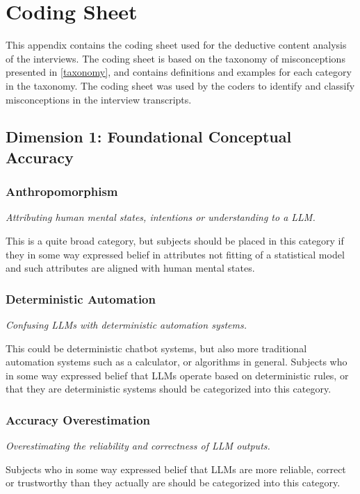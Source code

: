 \chapter{Coding Sheet}\label{coding_sheet}
This appendix contains the coding sheet used for the deductive content analysis of the interviews. The coding sheet is based on the taxonomy of misconceptions presented in \autoref{taxonomy}, and contains definitions and examples for each category in the taxonomy. The coding sheet was used by the coders to identify and classify misconceptions in the interview transcripts.

\section*{Dimension 1: Foundational Conceptual Accuracy}

\subsection*{Anthropomorphism}

\textit{Attributing human mental states, intentions or understanding to a LLM.}

This is a quite broad category, but subjects should be placed in this category if they in some way expressed belief in attributes not fitting of a statistical model and such attributes are aligned with human mental states.

\subsection*{Deterministic Automation}

\textit{Confusing LLMs with deterministic automation systems.}

This could be deterministic chatbot systems, but also more traditional automation systems such as a calculator, or algorithms in general. Subjects who in some way expressed belief that LLMs operate based on deterministic rules, or that they are deterministic systems should be categorized into this category.

\subsection*{Accuracy Overestimation}

\textit{Overestimating the reliability and correctness of LLM outputs.}

Subjects who in some way expressed belief that LLMs are more reliable, correct or trustworthy than they actually are should be categorized into this category.

